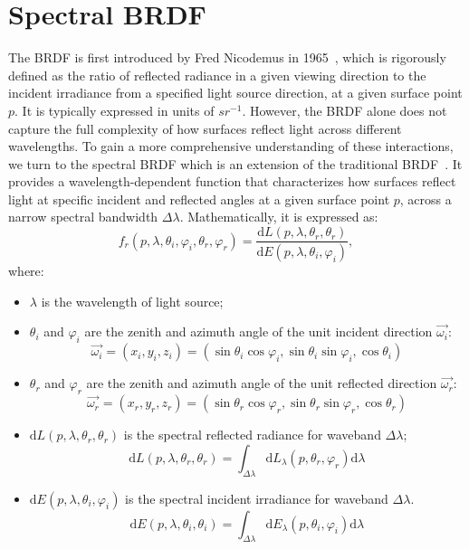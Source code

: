 
\section{Spectral BRDF}
\label{sec: spectral brdf}

The BRDF is first introduced by Fred Nicodemus in 1965~\cite{1965_Nicodemus}, which is rigorously defined as the ratio of reflected radiance in a given viewing direction to the incident irradiance from a specified light source direction, at a given surface point $p$.
It is typically expressed in units of $sr^{-1}$.
However, the BRDF alone does  not capture the full complexity of how surfaces reflect light across different wavelengths.
To gain a more comprehensive understanding of these interactions, we turn to the spectral BRDF which is an extension of the traditional BRDF~\cite{2022_Hebert}.
It provides a wavelength-dependent function that characterizes how surfaces reflect light at specific incident and reflected angles at a given surface point $p$, across a narrow spectral bandwidth $\Delta \lambda$.
Mathematically, it is expressed as:
\begin{equation}
    f_r(p, \lambda, \theta_i, \varphi_i, \theta_r, \varphi_r) = \frac{\mathrm{d}{L(p, \lambda, \theta_r, \theta_r)}}{\mathrm{d}E(p, \lambda, \theta_i, \varphi_i)},
\end{equation}
where:
\begin{itemize}
    \item $\lambda$ is the wavelength of light source;
    \item $\theta_i$ and $\varphi_i$ are the zenith and azimuth angle of the unit incident direction $\overrightarrow{\omega_i}$:
          \[
              \overrightarrow{\omega_i} = (x_i, y_i, z_i)= (\sin\theta_i \cos \varphi_i, \sin\theta_i \sin\varphi_i, \cos\theta_i)
          \]
    \item $\theta_r$ and $\varphi_r$ are the zenith and azimuth angle of the unit reflected direction $\overrightarrow{\omega_r}$:
          \[
              \overrightarrow{\omega_r} = (x_r, y_r, z_r)= (\sin\theta_r \cos \varphi_r, \sin\theta_r \sin\varphi_r, \cos\theta_r)
          \]
    \item $\mathrm{d}L(p, \lambda, \theta_r, \theta_r)$ is the spectral reflected radiance for waveband $\Delta \lambda$;
          \[
              \mathrm{d}L(p, \lambda, \theta_r, \theta_r) = \int_{\Delta \lambda} \mathrm{d}L_\lambda(p, \theta_r, \varphi_r) \mathrm{d}\lambda
          \]
    \item $\mathrm{d}E(p, \lambda, \theta_i, \varphi_i)$ is the spectral incident irradiance for waveband $\Delta \lambda$.
          \[
              \mathrm{d}E(p, \lambda, \theta_i, \theta_i) = \int_{\Delta \lambda} \mathrm{d}E_\lambda(p, \theta_i, \varphi_i) \mathrm{d}\lambda
          \]
\end{itemize}

